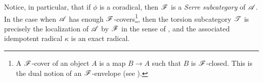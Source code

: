 \begin{rmk}
Notice, in particular, that if $\phi$ is a coradical, then 
$\mathscr{F}$ is a \emph{Serre subcategory} of $\mathscr{A}$. In the case
when $\mathscr{A}$ has enough $\mathscr{F}$-covers\footnote{A 
$\mathscr{F}$-cover of an object $A$ is a map $B \to A$ such that $B$ 
is $\mathscr{F}$-closed. This is the dual notion of an 
$\mathscr{F}$-envelope (see \cite{Swan}).}, then the torsion 
subcategory $\mathscr{T}$ is precisely the localization of $\mathscr{A}$ 
by $\mathscr{F}$ in the sense of \cite{Swan}, and the associated 
idempotent radical $\kappa$ is an exact radical.
\end{rmk}
